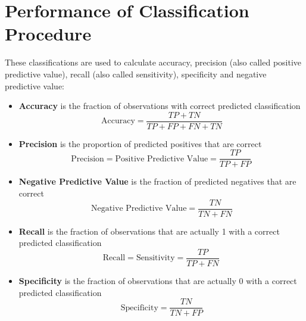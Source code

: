 \documentclass[]{article}
\begin{document}
\tableofcontents
\newpage
\section{Performance of Classification Procedure}

These classifications are used to calculate accuracy, precision (also called positive predictive value), recall (also called sensitivity), specificity and negative predictive value:

\begin{itemize}
\item  \textbf{Accuracy} is the fraction of observations with correct predicted classification
\[ \mbox{Accuracy}=\frac{TP+TN}{TP+FP+FN+TN}\]


\item \textbf{Precision} is the proportion of predicted positives that are correct
\[
\mbox{Precision} = \mbox{Positive Predictive Value} =\frac{TP}{TP+FP} \, \]

\item \textbf{Negative Predictive Value} is the  fraction of predicted negatives that are correct
\[\mbox{Negative Predictive Value} = \frac{TN}{TN+FN}\]

\item \textbf{Recall} is the fraction of observations that are actually 1 with a correct predicted classification
\[ 
\mbox{Recall} = \mbox{Sensitivity} = \frac{TP}{TP+FN} \,  \]

\item \textbf{Specificity} is the fraction of observations that are actually 0 with a correct predicted classification
\[ \mbox{Specificity} = \frac{TN}{TN+FP} \]

\end{itemize}
\end{document}

